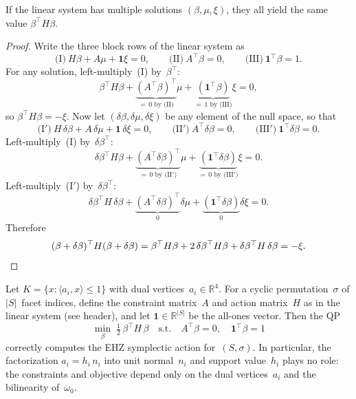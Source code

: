 \begin{notationupdated}
\begin{lemma}\label{lem:well-defined}
If the linear system has multiple solutions
$(\beta, \mu, \xi)$, they all yield the same value
$\beta^\top H \beta$.
\end{lemma}

\begin{proof}
Write the three block rows of the linear system as
\[
  \text{(I)}\ H\beta + A\mu + \mathbf{1}\xi = 0, \qquad
  \text{(II)}\ A^\top \beta = 0, \qquad
  \text{(III)}\ \mathbf{1}^\top \beta = 1.
\]
For any solution, left-multiply~(I) by~$\beta^\top$:
\[
  \beta^\top H\beta
  + \underbrace{(A^\top\beta)^\top}_{=\,0\text{ by (II)}}\mu
  + \underbrace{(\mathbf{1}^\top\beta)}_{=\,1\text{ by (III)}}\xi
  = 0,
\]
so $\beta^\top H\beta = -\xi$.
Now let $(\delta\beta, \delta\mu, \delta\xi)$ be any element
of the null space, so that
\[
  \text{(I$'$)}\ H\,\delta\beta + A\,\delta\mu + \mathbf{1}\,\delta\xi = 0, \qquad
  \text{(II$'$)}\ A^\top\delta\beta = 0, \qquad
  \text{(III$'$)}\ \mathbf{1}^\top\delta\beta = 0.
\]
Left-multiply~(I) by~$\delta\beta^\top$:
\[
  \delta\beta^\top H\beta
  + \underbrace{(A^\top\delta\beta)^\top}_{=\,0\text{ by (II$'$)}}\mu
  + \underbrace{(\mathbf{1}^\top\delta\beta)}_{=\,0\text{ by (III$'$)}}\xi
  = 0.
\]
Left-multiply~(I$'$) by~$\delta\beta^\top$:
\[
  \delta\beta^\top H\,\delta\beta
  + \underbrace{(A^\top\delta\beta)^\top}_{0}\delta\mu
  + \underbrace{(\mathbf{1}^\top\delta\beta)}_{0}\delta\xi
  = 0.
\]
Therefore
\[
  (\beta + \delta\beta)^\top H(\beta + \delta\beta)
  = \beta^\top H\beta
    + 2\,\delta\beta^\top H\beta
    + \delta\beta^\top H\,\delta\beta
  = -\xi. \qedhere
\]
\end{proof}
\end{notationupdated}


\begin{lemma}%
\label{lem:dual-vertex-qp}
Let $K = \{x : \langle a_i, x \rangle \leq 1\}$ with dual
vertices~$a_i \in \mathbb{R}^4$.
For a cyclic permutation~$\sigma$ of $|S|$~facet indices,
define the constraint matrix~$A$ and action matrix~$H$ as in the
linear system (see header), and let $\mathbf{1} \in \mathbb{R}^{|S|}$
be the all-ones vector.
Then the QP
\[
  \min_{\beta}\; \tfrac{1}{2}\,\beta^\top H\,\beta
  \quad\text{s.t.}\quad
  A^\top \beta = 0,\quad
  \mathbf{1}^\top \beta = 1
\]
correctly computes the EHZ symplectic action for~$(S, \sigma)$.
In particular, the factorization $a_i = h_i\, n_i$
into unit normal~$n_i$ and support value~$h_i$ plays no role:
the constraints and objective depend only on the dual
vertices~$a_i$ and the bilinearity of~$\omega_0$.
\end{lemma}

